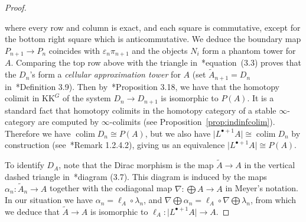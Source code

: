 \documentclass[a4paper,reqno]{amsart}
\theoremstyle{plain}
\theoremstyle{definition}
\theoremstyle{remark}
\numberwithin{equation}{section}
\newcommand{\id}{\mathrm{id}}
\newcommand{\KK}{\mathrm{KK}}
\newcommand{\gr}[1]{\lvert #1\rvert}
\DeclareMathOperator*{\colim}{colim}
\begin{document}
\begin{proof}
\begin{center}
\end{center}
where every row and column is exact, and each square is commutative, except for the bottom right square which is anticommutative. We deduce the boundary map $P_{n+1}\to P_n$ coincides with $\varepsilon_n \pi_{n+1}$  and the objects $N_i$ form a phantom tower for $A$. Comparing the top row above with the triangle in~\cite{mey:two}*{equation~(3.3)} proves that the $D_n$'s form a \emph{cellular approximation tower} for $A$ (set $\tilde{A}_{n+1}=D_n$ in~\cite{mey:two}*{Definition 3.9}). Then by~\cite{mey:two}*{Proposition 3.18}, we have that the homotopy colimit in $\KK^G$ of the system $D_n\to D_{n+1}$ is isomorphic to $P(A)$. It is a standard fact that homotopy colimits in the homotopy category of a stable $\infty$-category are computed by $\infty$-colimits (see Proposition~\ref{prop:indinfcolim}). Therefore we have $\colim D_n \cong P(A)$, but we also have $\gr{L^{\bullet+1} A} \cong \colim D_n$ by construction (see~\cite{lur:ha}*{Remark 1.2.4.2}), giving us an equivalence $\gr{L^{\bullet+1} A}\cong P(A)$.

To identify $D_A$, note that the Dirac morphism is the map $\tilde{A}\to A$ in the vertical dashed triangle in~\cite{mey:two}*{diagram (3.7)}. This diagram is induced by the maps $\alpha_n\colon \tilde{A}_n\to A$ together with the codiagonal map $\nabla\colon \bigoplus A\to A$ in Meyer's notation. In our situation we have $\alpha_n=\ell_A\circ \lambda_n$, and $\nabla\bigoplus\alpha_n = \ell_A\circ\nabla\bigoplus\lambda_n$, from which we deduce that $\tilde{A}\to A$ is isomorphic to $\ell_A\colon \gr{L^{\bullet+1} A}\to A$.
\end{proof}
\end{document}
